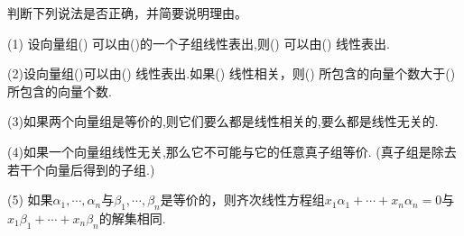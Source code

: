 \documentclass[a4paper]{report}
\begin{document}
\EX 判断下列说法是否正确，并简要说明理由。

(1) 设向量组(\uppercase\expandafter{}) 可以由(\uppercase\expandafter{})的一个子组线性表出,则(\uppercase\expandafter{}) 可以由(\uppercase\expandafter{}) 线性表出.

(2)设向量组(\uppercase\expandafter{})可以由(\uppercase\expandafter{}) 线性表出.如果(\uppercase\expandafter{}) 线性相关，则(\uppercase\expandafter{}) 所包含的向量个数大于(\uppercase\expandafter{}) 所包含的向量个数.

(3)如果两个向量组是等价的,则它们要么都是线性相关的,要么都是线性无关的.

(4)如果一个向量组线性无关,那么它不可能与它的任意真子组等价. (真子组是除去若干个向量后得到的子组.)

(5) 如果$\alpha_1,\cdots,\alpha_n$与$\beta_1,\cdots,\beta_n$是等价的，则齐次线性方程组$x_1\alpha_1+\cdots+x_n\alpha_n=0$与
$x_1\beta_1+\cdots+x_n\beta_n$的解集相同.
\end{document}
